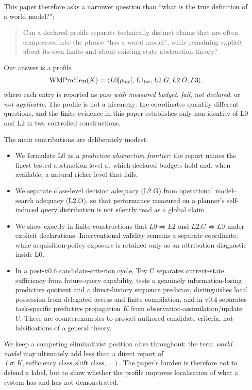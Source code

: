 \documentclass[10pt]{article}
\newcommand{\WMProfile}{\mathrm{WMProfile}}
\begin{document}
This paper therefore asks a narrower question than ``what is the true definition of a world model?'':
\begin{quote}
Can a declared profile separate technically distinct claims that are often compressed into the phrase ``has a world model'', while remaining explicit about its own limits and about existing state-abstraction theory?
\end{quote}

Our answer is a profile
\[
\WMProfile_{\mathcal D}(X)
=
\langle L0[\rho_{\rm pol}],L1_{\rm int},L2.G,L2.O,L3\rangle,
\]
where each entry is reported as \emph{pass with measured budget}, \emph{fail}, \emph{not declared}, or \emph{not applicable}. The profile is not a hierarchy: the coordinates quantify different questions, and the finite evidence in this paper establishes only non-identity of L0 and L2 in two controlled constructions.

The main contributions are deliberately modest:
\begin{itemize}
    \item We formulate L0 as a \emph{predictive abstraction frontier}: the report names the finest tested abstraction level at which declared budgets hold and, when available, a natural richer level that fails.
    \item We separate class-level decision adequacy (L2.G) from operational model--search adequacy (L2.O), so that performance measured on a planner's self-induced query distribution is not silently read as a global claim.
    \item We show exactly in finite constructions that $L0\not\Rightarrow L2$ and $L2.G\not\Rightarrow L0$ under explicit declarations. Interventional validity remains a separate coordinate, while acquisition-policy exposure is retained only as an attribution diagnostic inside L0.
    \item In a post-v0.6 candidate-criterion cycle, Toy C separates current-state sufficiency from future-query capability, tests a genuinely information-losing predictive quotient and a direct-history sequence predictor, distinguishes local possession from delegated access and finite compilation, and in v0.4 separates task-specific predictive propagation $K$ from observation-assimilation/update $U$. These are counterexamples to project-authored candidate criteria, not falsifications of a general theory.
\end{itemize}

We keep a competing eliminativist position alive throughout: the term \emph{world model} may ultimately add less than a direct report of $(\sigma,K,\text{sufficiency class},\text{shift class},\ldots)$. The paper's burden is therefore not to defend a label, but to show whether the profile improves localisation of what a system has and has not demonstrated.
\end{document}
